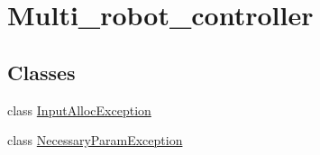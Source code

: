 \hypertarget{group__multi__robot__controller}{}\section{Multi\+\_\+robot\+\_\+controller}
\label{group__multi__robot__controller}
\subsection*{Classes}
\begin{DoxyCompactItemize}
\item 
class \hyperlink{classInputAllocException}{Input\+Alloc\+Exception}
\item 
class \hyperlink{classNecessaryParamException}{Necessary\+Param\+Exception}
\end{DoxyCompactItemize}
